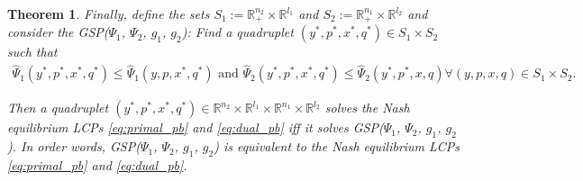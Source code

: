 \documentclass{article} %
\newtheorem{theorem}{Theorem} \newtheorem{lemma}[theorem]{Lemma}
\begin{document}
\begin{theorem}
Finally, define the sets $S_1 := \mathbb{R}^{n_2}_+ \times \mathbb{R}^{l_1}$ and $S_2 :=
\mathbb{R}^{n_1}_+ \times \mathbb{R}^{l_2}$ and consider the
GSP($\Psi_1$, $\Psi_2$, $g_1$, $g_2$): Find a quadruplet $(y^*,p^*, x^*, q^*) \in
S_1 \times S_2$ such that
\begin{eqnarray}
    \hat{\Psi}_1(y^*, p^*, x^*, q^*) \le \hat{\Psi}_1(y, p, x^*,
    q^*) \text{ and }\hat{\Psi}_2(y^*, p^*, x^*, q^*)
    \le \hat{\Psi}_2(y^*, p^*, x, q) \forall (y,p, x, q) \in S_1
    \times S_2.
  \label{eq:unconstrained_pb}
\end{eqnarray}
\label{thm:pd}

Then a quadruplet $(y^*,p^*, x^*, q^*) \in \mathbb{R}^{n_2}
  \times \mathbb{R}^{l_1} \times \mathbb{R}^{n_1} \times
  \mathbb{R}^{l_2}$ solves the Nash equilibrium LCPs
  \eqref{eq:primal_pb} and \eqref{eq:dual_pb} iff it solves
  GSP($\Psi_1$, $\Psi_2$, $g_1$, $g_2$). In order words, GSP($\Psi_1$,
  $\Psi_2$, $g_1$, $g_2$) is equivalent to the Nash equilibrium LCPs
  \eqref{eq:primal_pb} and \eqref{eq:dual_pb}.
  \label{thm:pd}
\end{theorem}
\end{document}
